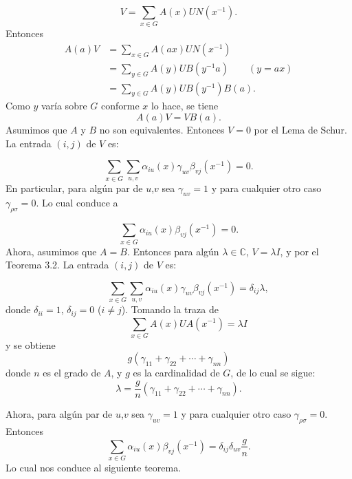 \documentclass[12pt]{book}
\theoremstyle{definition}
\newcounter{in}
\begin{document}
\begin{equation*}
 V=\sum_{x \in G} A(x)UN(x^{-1}).
\end{equation*}
Entonces
\begin{equation*}
  \begin{aligned}
    A(a)V &=\sum_{x \in G} A(ax)UN(x^{-1})\\
    &=\sum_{y \in G} A(y)UB(y^{-1}a) \qquad (y=ax)\\
    &=\sum_{y \in G} A(y)UB(y^{-1})B(a).
  \end{aligned}
\end{equation*}
Como $y$ varía sobre $G$ conforme $x$ lo hace, se tiene
\begin{equation*}
  A(a)V=VB(a).
\end{equation*}  
Asumimos que $A$ y $B$ no son equivalentes. Entonces $V=0$ por el Lema
de Schur. La entrada $(i,j)$ de $V$ es:

\begin{equation*}
 \sum_{x \in G} \sum_{u,v} \alpha_{iu}(x) \gamma_{uv} \beta_{vj}(x^{-1}) = 0.
\end{equation*}
En particular, para algún par de $u$,$v$ sea $\gamma_{uv}=1$ y para
cualquier otro caso $\gamma_{\rho \sigma}=0$. Lo cual conduce a

\begin{equation*}
  \sum_{x \in G} \alpha_{iu}(x) \beta_{vj}(x^{-1}) = 0.
\end{equation*}
Ahora, asumimos que $A=B$. Entonces para algún
$\lambda \in \mathbb{C}$, $V=\lambda I$, y por el Teorema 3.2. La
entrada $(i,j)$ de $V$ es:

\begin{equation*}
\qquad \sum_{x \in G} \sum_{u,v} \alpha_{iu}(x) \gamma_{uv} \beta_{vj}(x^{-1}) = \delta_{ij}\lambda,
\end{equation*}
donde $\delta_{ii}=1$, $\delta_{ij}=0$ ($i \neq j$). Tomando la traza de
\begin{equation*}
\qquad \sum_{x \in G} A(x)UA(x^{-1}) = \lambda I
\end{equation*}
y se obtiene
\begin{equation*}
  g(\gamma_{11}+\gamma_{22}+ \cdots +\gamma_{nn})
\end{equation*}  
donde $n$ es el grado de $A$, y $g$ es la cardinalidad de $G$, de lo cual se sigue:
\begin{equation*}
\lambda=\frac{g}{n}(\gamma_{11}+\gamma_{22}+ \cdots + \gamma_{nn}).
\end{equation*}

Ahora, para algún par de $u$,$v$ sea $\gamma_{uv}=1$ y para cualquier otro caso $\gamma_{\rho \sigma}=0$. Entonces
\begin{equation*}
  \sum_{x \in G} \alpha_{iu}(x) \beta_{vj}(x^{-1}) = \delta_{ij} \delta_{uv}\frac{g}{n}.
\end{equation*}
Lo cual nos conduce al siguiente teorema.
\end{document}
